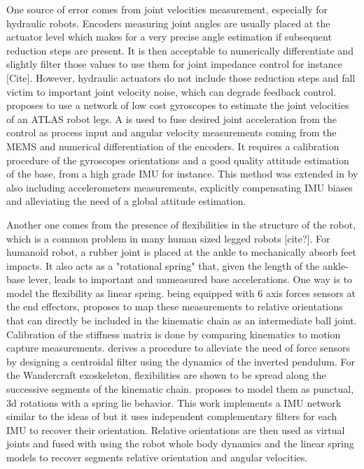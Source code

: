 One source of error comes from joint velocities measurement, especially for hydraulic robots. Encoders measuring joint angles are usually placed 
at the actuator level which makes for a very precise angle estimation if subsequent reduction steps are present. It is then acceptable to numerically 
differentiate and slightly filter those values to use them for joint impedance control for instance [Cite]. However, hydraulic
actuators do not include those reduction steps and fall victim to important joint velocity noise, which can degrade feedback control.
\cite{xinjilefu2016distributed} proposes to use a network of low cost gyroscopes to estimate the joint velocities of an ATLAS robot legs. A \KalmanF
is used to fuse desired joint acceleration from the control as process input and angular velocity measurements coming from the MEMS and numerical
differentiation of the encoders. It requires a calibration procedure of the gyroscopes orientations and a good quality attitude
estimation of the base, from a high grade IMU for instance. This method was extended in \cite{rotella2016imu} by also including
accelerometers measurements, explicitly compensating IMU biases and alleviating the need of a global attitude estimation.

Another one comes from the presence of flexibilities in the structure of the robot, which is a common problem in many human sized legged robots [cite?]. 
For  humanoid robot, a rubber joint is placed  at the ankle to mechanically absorb feet impacts. 
It also acts as a "rotational spring" that, given the length of the ankle-base lever, 
leads to important and unmeasured base accelerations. One way is to model the flexibility as linear spring.  being equipped with 6 axis 
forces sensors at the end effectors, \cite{flayols2017experimental} proposes to map these measurements to relative orientations that can 
directly be included in the kinematic chain as an intermediate ball joint. Calibration of the stiffness matrix is done by comparing 
kinematics to motion capture measurements. \cite{benallegue2015estimation} derives a procedure to alleviate the need of force sensors by 
designing a centroidal filter using the dynamics of the inverted pendulum. For the Wandercraft exoskeleton, flexibilities
are shown to be spread along the successive segments of the kinematic chain. \cite{vigne2018estimation} proposes to model them as punctual, 
3d rotations with a spring lie behavior. This work implements a IMU network similar to the ideas of \cite{xinjilefu2016distributed,rotella2016imu} 
but it uses independent complementary filters for each IMU to recover their orientation. Relative orientations are then used as 
virtual joints and fused with using the robot whole body dynamics and the linear spring models to recover segments relative orientation and angular velocities.

